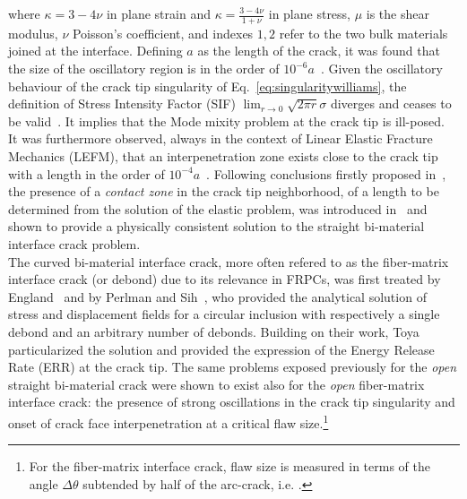\documentclass[review]{elsarticle}
\begin{document}
where $\kappa=3-4\nu$ in plane strain and $\kappa=\frac{3-4\nu}{1+\nu}$ in plane stress, $\mu$ is the shear modulus, $\nu$ Poisson's coefficient, and indexes $1,2$ refer to the two bulk materials joined at the interface. Defining $a$ as the length of the crack, it was found that the size of the oscillatory region is in the order of $10^{-6}a$~\cite{Erdogan1963}. Given the oscillatory behaviour of the crack tip singularity of Eq.~\ref{eq:singularitywilliams}, the definition of Stress Intensity Factor (SIF) $\lim_{r\rightarrow 0}\sqrt{2\pi r}\sigma$ diverges and ceases to be valid~\cite{Comninou1990}. It implies that the Mode mixity problem at the crack tip is ill-posed.\\
It was furthermore observed, always in the context of Linear Elastic Fracture Mechanics (LEFM), that an interpenetration zone exists close to the crack tip~\cite{England1965,Malyshev1965} with a length in the order of $10^{-4}a$~\cite{England1965}. Following conclusions firstly proposed in~\cite{Malyshev1965}, the presence of a \emph{contact zone} in the crack tip neighborhood, of a length to be determined from the solution of the elastic problem, was introduced in~\cite{Comninou1977} and shown to provide a physically consistent solution to the straight bi-material interface crack problem.\\
The curved bi-material interface crack, more often refered to as the fiber-matrix interface crack (or debond) due to its relevance in FRPCs, was first treated by England~\cite{England1966} and by Perlman and Sih~\cite{Perlman1967}, who provided the analytical solution of stress and displacement fields for a circular inclusion with respectively a single debond and an arbitrary number of debonds. Building on their work, Toya~\cite{Toya1974} particularized the solution and provided the expression of the Energy Release Rate (ERR) at the crack  tip. The same problems exposed previously for the \emph{open} straight bi-material crack were shown to exist also for the \emph{open} fiber-matrix interface crack: the presence of strong oscillations in the crack tip singularity and onset of crack face interpenetration at a critical flaw size.\footnote{For the fiber-matrix interface crack, flaw size is measured in terms of the angle $\Delta\theta$ subtended by half of the arc-crack, i.e. .}\\
\end{document}
